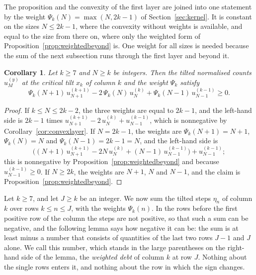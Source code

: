 \documentclass{amsart}
\makeatletter
\newtheorem{corollary}[theorem]{Corollary}
\theoremstyle{definition}
\theoremstyle{remark}
\numberwithin{equation}{section}
\def\subsection{\@startsection{subsection}{2}\z@{.5\linespacing\@plus.7\linespacing}{-.5em}{\normalfont\bfseries\boldmath}}
\makeatother
\begin{document}
The proposition and the convexity of the first layer
are joined into one statement by the weight $\Psi_k(N)=\max(N,2k-1)$ of
Section~\ref{sec:kernel}. It is constant on the sizes $N\le2k-1$, where the
convexity without weights is available, and equal to the size from there
on, where only the weighted form of Proposition~\ref{prop:weightedbeyond}
is. One weight for all sizes is needed because the sum of the next
subsection runs through the first layer and beyond it.

\begin{corollary}\label{cor:weightedall}
Let $k\ge7$ and $N\ge k$ be integers. Then the tilted normalised counts
$u^{(y)}_M$ at the critical tilt $x_k$ of column $k$ and the weight $\Psi_k$
satisfy
\[
\Psi_k(N+1)\,u^{(k+1)}_{N+1}-2\,\Psi_k(N)\,u^{(k)}_N
+\Psi_k(N-1)\,u^{(k-1)}_{N-1}\ge0 .
\]
\end{corollary}

\begin{proof}
If $k\le N\le2k-2$, the three weights are equal to $2k-1$, and the
left-hand side is $2k-1$ times
$u^{(k+1)}_{N+1}-2\,u^{(k)}_N+u^{(k-1)}_{N-1}$, which is nonnegative by
Corollary~\ref{cor:convexlayer}. If $N=2k-1$, the weights are
$\Psi_k(N+1)=N+1$, $\Psi_k(N)=N$ and $\Psi_k(N-1)=2k-1=N$, and the left-hand
side is
\[
\bigl((N+1)\,u^{(k+1)}_{N+1}-2N\,u^{(k)}_N+(N-1)\,u^{(k-1)}_{N-1}\bigr)
+u^{(k-1)}_{N-1} ;
\]
this is nonnegative by Proposition~\ref{prop:weightedbeyond} and because
$u^{(k-1)}_{N-1}\ge0$. If $N\ge2k$, the weights are $N+1$, $N$ and $N-1$,
and the claim is Proposition~\ref{prop:weightedbeyond}.
\end{proof}

\subsection{The weighted debt of a column}\label{subsec:beyond-debt}

Let $k\ge7$, and let $J\ge k$ be an integer. We now sum the tilted steps
$\eta_n$ of column $k$ over rows $k\le n\le J$, with the weights
$\Psi_k(n)$. In the rows before the first positive row of the column the
steps are not positive, so that such a sum can be negative, and the
following lemma says how negative it can be: the sum is at least minus a
number that consists of quantities of the last two rows $J-1$ and $J$
alone. We call this number, which stands in the large parentheses on the
right-hand side of the lemma, the \emph{weighted debt} of column $k$ at row
$J$. Nothing about the
single rows enters it, and nothing about the row in which the sign changes.
\end{document}
